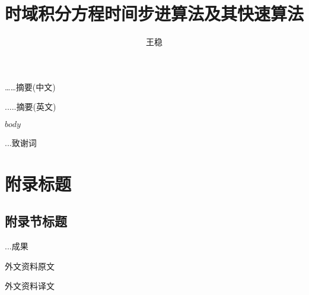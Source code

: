 \documentclass[master]{thesis-uestc}
\title{时域积分方程时间步进算法及其快速算法}{The Time Marching Scheme of Time Domain Integral Equation and Corresponding Fast Algorithm}
\author{王稳}{Wang Wen}
\begin{document}
\makecover

\begin{chineseabstract}
……摘要(中文)

\end{chineseabstract}

\begin{englishabstract}
.....摘要(英文)

\end{englishabstract}

\thesistableofcontents

$body$

\thesisacknowledgement
...致谢词

\thesisappendix

\chapter{附录标题}           %
\section{附录节标题}       %

\nocite{*}

% 
% 

...成果

\thesistranslationoriginal
外文资料原文

\thesistranslationchinese
外文资料译文
\end{document}
